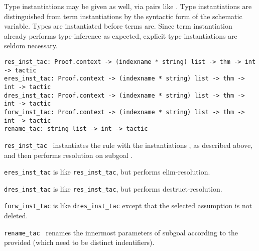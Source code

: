 \begin{isabellebody}
\begin{isamarkuptext}
  Type instantiations may be given as well, via pairs like .  Type instantiations are distinguished from term
  instantiations by the syntactic form of the schematic variable.
  Types are instantiated before terms are.  Since term instantiation
  already performs type-inference as expected, explicit type
  instantiations are seldom necessary.%
\end{isamarkuptext}%
\isamarkuptrue%
%
\isadelimmlref
%
\endisadelimmlref
%
\isatagmlref
%
\begin{isamarkuptext}%
\begin{mldecls}
  \verb|res_inst_tac: Proof.context -> (indexname * string) list -> thm -> int -> tactic| \\
  \verb|eres_inst_tac: Proof.context -> (indexname * string) list -> thm -> int -> tactic| \\
  \verb|dres_inst_tac: Proof.context -> (indexname * string) list -> thm -> int -> tactic| \\
  \verb|forw_inst_tac: Proof.context -> (indexname * string) list -> thm -> int -> tactic| \\[1ex]
  \verb|rename_tac: string list -> int -> tactic| \\
  \end{mldecls}

  \begin{description}

  \item \verb|res_inst_tac|~ instantiates the
  rule  with the instantiations , as described
  above, and then performs resolution on subgoal .
  
  \item \verb|eres_inst_tac| is like \verb|res_inst_tac|, but performs
  elim-resolution.

  \item \verb|dres_inst_tac| is like \verb|res_inst_tac|, but performs
  destruct-resolution.

  \item \verb|forw_inst_tac| is like \verb|dres_inst_tac| except that
  the selected assumption is not deleted.

  \item \verb|rename_tac|~ renames the innermost
  parameters of subgoal  according to the provided  (which need to be distinct indentifiers).


\end{description}
\end{isamarkuptext}
\end{isabellebody}
